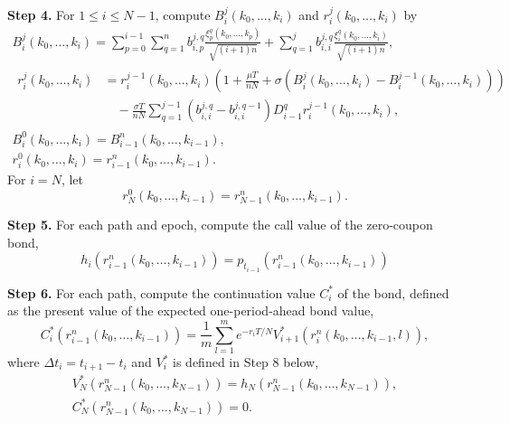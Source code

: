 \documentclass[reqno]{amsart}
\begin{document}
\noindent\textbf{Step 4.} For $1\le i \le N-1$, compute 
$B_{i}^{j}\left(k_0,\dots,k_i\right)$ and $r_{i}^{j}\left(k_0,\dots,k_i\right)$ by
\begin{equation}
\label{pathgeneration}
\begin{gathered}
 B_{i}^{j}\left(k_0,\dots,k_i\right)
 =\sum_{p=0}^{i-1}\sum_{q=1}^{n}b_{i,p}^{j,q} \frac{\xi_p^q\left(k_0,\dots,k_p\right)}
 {\sqrt{\left(i+1\right)n}} +\sum_{q=1}^{j}b_{i,i}^{j,q} 
 \frac{\xi_i^q\left(k_0,\dots,k_i\right)}{\sqrt{\left(i+1\right)n}} ,\\
\begin{aligned}
r_{i}^{j}\left(k_0,\dots,k_i\right)
&= r_{i}^{j-1}\left(k_0,\dots,k_i\right)\left(1+\frac{\mu T}{nN}+\sigma\left(B_{i}^{j}
 \left(k_0,\dots,k_i\right)-B_{i}^{j-1}\left(k_0,\dots,k_i\right)\right)\right)\\
&\quad - \frac{\sigma T}{nN} \sum_{q=1}^{j-1}\left(b_{i,i}^{j,q}-b_{i,i}^{j,q-1}\right)
  D_{i-1}^q r_{i}^{j-1}\left(k_0,\dots,k_i\right) ,
\end{aligned}\\
 B_{i}^{0}\left(k_0,\dots,k_i\right)=B_{i-1}^{n}\left(k_0,\dots,k_{i-1}\right),\\
 r_{i}^{0}\left(k_0,\dots,k_i\right)=r_{i-1}^{n}\left(k_0,\dots,k_{i-1}\right).
\end{gathered}
\end{equation}
For $i=N$, let
\[
 r_{N}^{0}\left(k_0,\dots,k_{i-1}\right)=r_{N-1}^{n}\left(k_0,\dots,k_{i-1}\right).
\]
\smallskip

\noindent\textbf{Step 5.} For each path and epoch, compute the call value of the 
zero-coupon bond,
\[
 h_i\left(r_{i-1}^{n}\left(k_0,\dots,k_{i-1}\right)\right)=
 p_{t_{i-1}}\left(r_{i-1}^n\left(k_0,\dots,k_{i-1}\right)\right)
\]
\smallskip

\noindent\textbf{Step 6.} For each path, compute the continuation value $C_i^*$ of 
the bond, defined as the present value of the expected one-period-ahead bond value,
\[
 C_i^*\left(r_{i-1}^n\left(k_0, \dots, k_{i-1}\right)\right)=\frac{1}{m} \sum_{l=1}^m
 e^{- r_iT/N}
V_{i+1}^*\left(r_i^n\left(k_0, \dots, k_{i-1}, l\right)\right) ,
\]
where $\Delta t_i=t_{i+1}-t_i$ and $V_i^*$ is defined in Step 8 below,
\begin{gather*}
 V_N^*\left(r_{N-1}^{n}\left(k_0,\dots,k_{N-1}\right)\right)
 = h_N\left(r_{N-1}^{n}\left(k_0,\dots,k_{N-1}\right)\right),\\
 C_N^*\left(r_{N-1}^{n}\left(k_0,\dots,k_{N-1}\right)\right)= 0.
\end{gather*}
\smallskip
\end{document}
